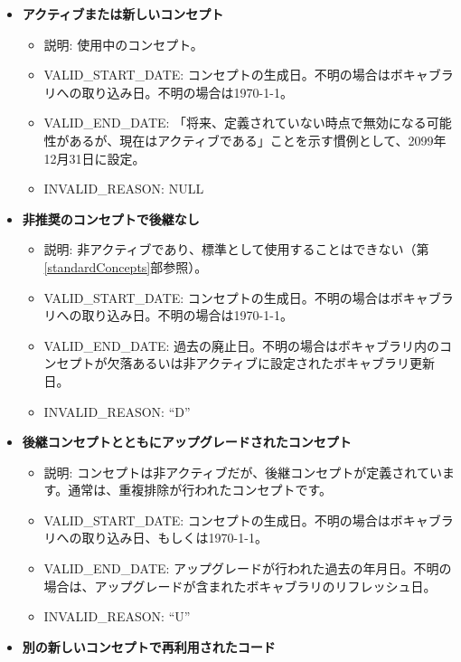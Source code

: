 \documentclass[
  11pt]{book}
\providecommand{\tightlist}{%
  \setlength{\itemsep}{0pt}\setlength{\parskip}{0pt}}
\theoremstyle{definition}
\theoremstyle{definition}
\theoremstyle{definition}
\theoremstyle{definition}
\theoremstyle{remark}
\begin{document}
\begin{itemize}
\tightlist
\item
  \textbf{アクティブまたは新しいコンセプト}

  \begin{itemize}
  \tightlist
  \item
    説明: 使用中のコンセプト。
  \item
    VALID\_START\_DATE: コンセプトの生成日。不明の場合はボキャブラリへの取り込み日。不明の場合は1970-1-1。
  \item
    VALID\_END\_DATE: 「将来、定義されていない時点で無効になる可能性があるが、現在はアクティブである」ことを示す慣例として、2099年12月31日に設定。
  \item
    INVALID\_REASON: NULL
  \end{itemize}
\item
  \textbf{非推奨のコンセプトで後継なし}

  \begin{itemize}
  \tightlist
  \item
    説明: 非アクティブであり、標準として使用することはできない（第\ref{standardConcepts}部参照）。
  \item
    VALID\_START\_DATE: コンセプトの生成日。不明の場合はボキャブラリへの取り込み日。不明の場合は1970-1-1。
  \item
    VALID\_END\_DATE: 過去の廃止日。不明の場合はボキャブラリ内のコンセプトが欠落あるいは非アクティブに設定されたボキャブラリ更新日。
  \item
    INVALID\_REASON: ``D''
  \end{itemize}
\item
  \textbf{後継コンセプトとともにアップグレードされたコンセプト}

  \begin{itemize}
  \tightlist
  \item
    説明: コンセプトは非アクティブだが、後継コンセプトが定義されています。通常は、重複排除が行われたコンセプトです。
  \item
    VALID\_START\_DATE: コンセプトの生成日。不明の場合はボキャブラリへの取り込み日、もしくは1970-1-1。
  \item
    VALID\_END\_DATE: アップグレードが行われた過去の年月日。不明の場合は、アップグレードが含まれたボキャブラリのリフレッシュ日。
  \item
    INVALID\_REASON: ``U''
  \end{itemize}
\item
  \textbf{別の新しいコンセプトで再利用されたコード}


\end{itemize}
\end{document}
